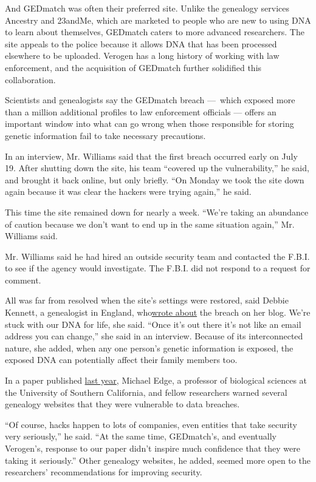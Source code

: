 And GEDmatch was often their preferred site. Unlike the genealogy
services Ancestry and 23andMe, which are marketed to people who are new
to using DNA to learn about themselves, GEDmatch caters to more advanced
researchers. The site appeals to the police because it allows DNA that
has been processed elsewhere to be uploaded. Verogen has a long history
of working with law enforcement, and the acquisition of GEDmatch further
solidified this collaboration.

Scientists and genealogists say the GEDmatch breach ---~which exposed
more than a million additional profiles to law enforcement officials ---
offers an important window into what can go wrong when those responsible
for storing genetic information fail to take necessary precautions.

In an interview, Mr. Williams said that the first breach occurred early
on July 19. After shutting down the site, his team ``covered up the
vulnerability,'' he said, and brought it back online, but only briefly.
``On Monday we took the site down again because it was clear the hackers
were trying again,'' he said.

This time the site remained down for nearly a week. ``We're taking an
abundance of caution because we don't want to end up in the same
situation again,'' Mr. Williams said.

Mr. Williams said he had hired an outside security team and contacted
the F.B.I. to see if the agency would investigate. The F.B.I. did not
respond to a request for comment.

All was far from resolved when the site's settings were restored, said
Debbie Kennett, a genealogist in England,
who\href{https://cruwys.blogspot.com/2020/07/major-privacy-breach-at-gedmatch.html}{wrote
about} the breach on her blog. We're stuck with our DNA for life, she
said. ``Once it's out there it's not like an email address you can
change,'' she said in an interview. Because of its interconnected
nature, she added, when any one person's genetic information is exposed,
the exposed DNA can potentially affect their family members too.

In a paper published
\href{https://www.ucdavis.edu/news/hobbyist-dna-services-may-be-open-genetic-hacking/}{last
year}, Michael Edge, a professor of biological sciences at the
University of Southern California, and fellow researchers warned several
genealogy websites that they were vulnerable to data breaches.

``Of course, hacks happen to lots of companies, even entities that take
security very seriously,'' he said. ``At the same time, GEDmatch's, and
eventually Verogen's, response to our paper didn't inspire much
confidence that they were taking it seriously.'' Other genealogy
websites, he added, seemed more open to the researchers' recommendations
for improving security.

